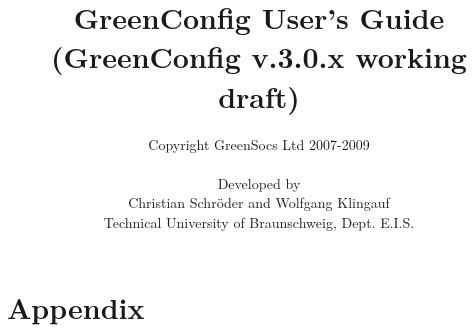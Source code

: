 \documentclass[a4paper,12pt,oneside]{gsbook}
\author{Copyright GreenSocs Ltd 2007-2009\\ \\Developed by\\Christian Schr\"oder and Wolfgang Klingauf\\Technical University of Braunschweig, Dept. E.I.S.}
\title{GreenConfig User's Guide\\(GreenConfig v.3.0.x working draft)}
\begin{document}
\maketitle

\tableofcontents
\enlargethispage{\baselineskip}





\appendix

	\chapter{Appendix}

	
\end{document}
